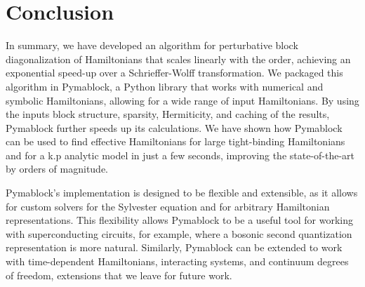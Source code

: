 \section{Conclusion}

In summary, we have developed an algorithm for perturbative block
diagonalization of Hamiltonians that scales linearly with the order,
achieving an exponential speed-up over a Schrieffer-Wolff transformation.
We packaged this algorithm in Pymablock, a Python library that works with
numerical and symbolic Hamiltonians, allowing for a wide range of input
Hamiltonians.
By using the inputs block structure, sparsity, Hermiticity, and caching of the
results, Pymablock further speeds up its calculations.
We have shown how Pymablock can be used to find effective Hamiltonians for
large tight-binding Hamiltonians and for a k.p analytic model in just a few
seconds, improving the state-of-the-art by orders of magnitude.

Pymablock's implementation is designed to be flexible and extensible, as it
allows for custom solvers for the Sylvester equation and for arbitrary
Hamiltonian representations.
This flexibility allows Pymablock to be a useful tool for working with
superconducting circuits, for example, where a bosonic second quantization
representation is more natural.
Similarly, Pymablock can be extended to work with time-dependent Hamiltonians,
interacting systems, and continuum degrees of freedom, extensions that we leave
for future work.
